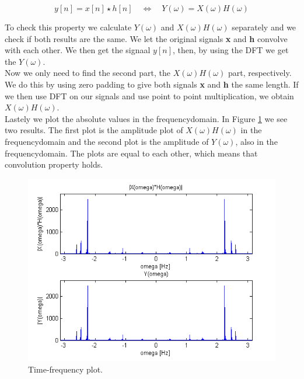 \documentclass[final]{scrreprt} %
\begin{document}
\begin{equation}
y[n] = x[n]\star h[n] \quad \Leftrightarrow \quad Y(\omega) = X(\omega)H(\omega) 
\label{eq:convprop}
\end{equation}

To check this property we calculate $Y(\omega)$ and $X(\omega)H(\omega)$ separately and we check if both results are the same. 
We let the original signals \textbf{x} and \textbf{h} convolve with each other.
We then get the signaal $y[n]$, then, by using the DFT we get the $Y(\omega)$.\\
Now we only need to find the second part, the $X(\omega)H(\omega)$ part, respectively.
We do this by using zero padding to give both signals \textbf{x} and \textbf{h} the same length. 
If we then use DFT on our signals and use point to point multiplication, we obtain  $X(\omega)H(\omega)$.\\
Lastely we plot the absolute values in the frequencydomain. 
In Figure \ref{fig:convpro} we see two results. 
The first plot is the amplitude plot of  $X(\omega)H(\omega)$ in the frequencydomain and the second plot is the amplitude of $Y(\omega)$, also in the frequencydomain.
The plots are equal to each other, which means that convolution property holds.


\begin{figure}[h]
\centering
\includegraphics[scale = 1.0]{resources/labday1/theconvolutionproperty.png}
\caption{Time-frequency plot.}
\label{fig:convpro}
\end{figure}
\end{document}
